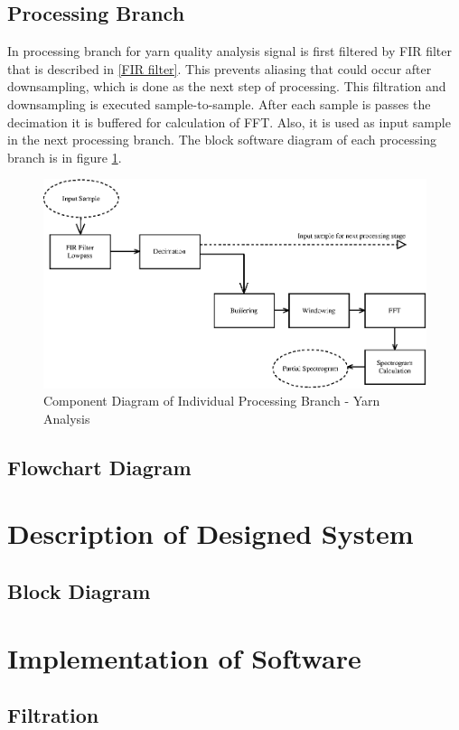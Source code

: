 \documentclass[twoside]{ctuthesis}
\theoremstyle{plain}
\theoremstyle{definition}
\theoremstyle{note}
\begin{document}
\subsection{Processing Branch}
In processing branch for yarn quality analysis signal is first filtered by FIR filter that is described in \ref{FIR filter}. This prevents aliasing that could occur after downsampling, which is done as the next step of processing. This filtration and downsampling is executed sample-to-sample. After each sample is passes the decimation it is buffered for calculation of FFT. Also, it is used as input sample in the next processing branch. The block software diagram of each processing branch is in figure \ref{fig:singleBranch_yarn}.
\begin{figure}[h]
	\centering
	\includegraphics[width=1.0\textwidth]{yarn_singleBranch.eps}
	\caption{Component Diagram of Individual Processing Branch - Yarn Analysis}
	\label{fig:singleBranch_yarn}
\end{figure}



\subsection{Flowchart Diagram}
\section{Description of Designed System}
\subsection{Block Diagram}
\section{Implementation of Software}
\subsection{Filtration}
\end{document}
